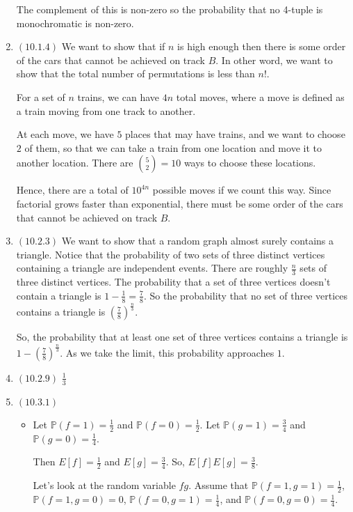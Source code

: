 \documentclass[12pt]{article}
\begin{document}
\begin{enumerate}[start=1,label={\bfseries Problem \arabic*:},leftmargin=1in]
    The complement of this is non-zero so the probability that no 4-tuple is monochromatic is non-zero.

    \item $(10.1.4)$ We want to show that if $n$ is high enough then there is some order of the cars that cannot be achieved on track $B$. 
    In other word, we want to show that the total number of permutations is less than $n!$. 
    
    For a set of $n$ trains, we can have $4n$ total moves, where a move is defined as a train moving from one track to another.

    At each move, we have $5$ places that may have trains, and we want to choose $2$ of them, so that we can take a train from one location and move it to another location. 
    There are $\binom{5}{2} = 10$ ways to choose these locations.
    
    Hence, there are a total of $10^{4n}$ possible moves if we count this way. Since factorial grows faster than exponential, there must be some order of the cars that cannot be achieved on track $B$.
    \item $(10.2.3)$ We want to show that a random graph almost surely contains a triangle. 
    Notice that the probability of two sets of three distinct vertices containing a triangle are independent events. 
    There are roughly $\frac{n}{3}$ sets of three distinct vertices.
    The probability that a set of three vertices doesn't contain a triangle is $1 - \frac{1}{8} = \frac{7}{8}$. So the probability that no set of three vertices contains a triangle is $\left( \frac{7}{8} \right)^{\frac{n}{3}}$.
    
    So, the probability that at least one set of three vertices contains a triangle is $1 - \left( \frac{7}{8} \right)^{\frac{n}{3}}$.
    As we take the limit, this probability approaches $1$.

    \item $(10.2.9)$ $\frac{1}{3}$
    \item $(10.3.1)$ 
    \begin{itemize}
        \item Let $\mathbb{P}(f = 1) = \frac{1}{2}$ and $\mathbb{P}(f = 0) = \frac{1}{2}$.
        Let $\mathbb{P}(g = 1) = \frac{3}{4}$ and $\mathbb{P}(g = 0) = \frac{1}{4}$. 

        Then $E[f] = \frac{1}{2}$ and $E[g] = \frac{3}{4}$. So, $ E[f]E[g] = \frac{3}{8}$.

        Let's look at the random variable $fg$. 
        Assume that $\mathbb{P}(f = 1, g = 1) = \frac{1}{2}$, $\mathbb{P}(f = 1, g = 0) = 0$, $\mathbb{P}(f = 0, g = 1) = \frac{1}{4}$, and $\mathbb{P}(f = 0, g = 0) = \frac{1}{4}$. 


\end{itemize}
\end{enumerate}
\end{document}
